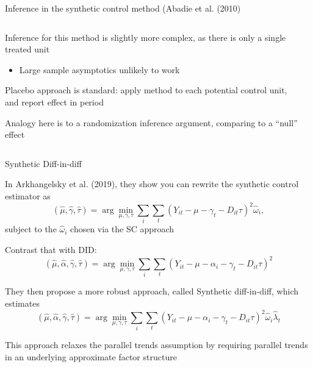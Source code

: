 \documentclass[notes,11pt, aspectratio=169]{beamer}
\newenvironment{wideitemize}{\itemize\addtolength{\itemsep}{10pt}}{\enditemize}
\begin{document}
\begin{frame}{Inference in the synthetic control method (Abadie et al. (2010)}
  \begin{columns}[T] %
    \begin{column}{0.5\textwidth}
  \begin{wideitemize}
  \item Inference for this method is slightly more complex, as there
    is only a single treated unit
    \begin{itemize}
    \item Large sample asymptotics unlikely to work
    \end{itemize}
  \item Placebo approach is standard: apply method to each potential
    control unit, and report effect in period
  \item Analogy here is to a randomization inference argument,
    comparing to a ``null'' effect
  \end{wideitemize}
\end{column}
\begin{column}{0.5\textwidth}
\end{column}
\end{columns}
\end{frame}

\begin{frame}{Synthetic Diff-in-diff}
  \begin{wideitemize}
  \item In Arkhangelsky et al. (2019), they show you can rewrite the synthetic control estimator as 
    \begin{equation*}
      (\hat{\mu}, \hat{\gamma}, \hat{\tau}) = \arg\min_{\mu, \gamma, \tau}\sum_{i}\sum_{t}(Y_{it} - \mu - \gamma_{t} - D_{it}\tau)^{2}\hat{\omega}_{i},
    \end{equation*}
    subject to the $\hat{\omega}_{i}$ chosen via the SC approach
  \item Contrast that with DID:
    \begin{equation*}
      (\hat{\mu},\hat{\alpha}, \hat{\gamma}, \hat{\tau}) = \arg\min_{\mu, \gamma, \tau}\sum_{i}\sum_{t}(Y_{it} - \mu -\alpha_{i} - \gamma_{t} - D_{it}\tau)^{2}
    \end{equation*}
  \item They then propose a more robust approach, called Synthetic diff-in-diff, which estimates
    \begin{equation*}
      (\hat{\mu},\hat{\alpha}, \hat{\gamma}, \hat{\tau}) = \arg\min_{\mu, \gamma, \tau}\sum_{i}\sum_{t}(Y_{it} - \mu -\alpha_{i} - \gamma_{t} - D_{it}\tau)^{2}\hat{\omega}_{i}\hat{\lambda}_{t}
    \end{equation*}
  \item This approach relaxes the parallel trends assumption by requiring parallel trends in an underlying approximate factor structure
  \end{wideitemize}
\end{frame}
\end{document}
